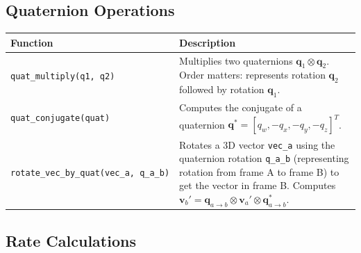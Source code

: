 \documentclass[
  letterpaper,
  DIV=11,
  numbers=noendperiod]{scrreprt}
\begin{document}
\subsection*{Quaternion Operations}\label{quaternion-operations}

\begin{longtable}[]{@{}
  >{\raggedright\arraybackslash}p{}
  >{\raggedright\arraybackslash}p{}@{}}
\toprule\noalign{}
\begin{minipage}[b]{\linewidth}\raggedright
Function
\end{minipage} & \begin{minipage}[b]{\linewidth}\raggedright
Description
\end{minipage} \\
\midrule\noalign{}
\endhead
\bottomrule\noalign{}
\endlastfoot
\texttt{quat\_multiply(q1,\ q2)} & Multiplies two quaternions
\(\mathbf{q}_1 \otimes \mathbf{q}_2\). Order matters: represents
rotation \(\mathbf{q}_2\) followed by rotation \(\mathbf{q}_1\). \\
\texttt{quat\_conjugate(quat)} & Computes the conjugate of a quaternion
\(\mathbf{q}^* = [q_w, -q_x, -q_y, -q_z]^T\). \\
\texttt{rotate\_vec\_by\_quat(vec\_a,\ q\_a\_b)} & Rotates a 3D vector
\texttt{vec\_a} using the quaternion rotation \texttt{q\_a\_b}
(representing rotation from frame A to frame B) to get the vector in
frame B. Computes
\(\mathbf{v}_b' = \mathbf{q}_{a \to b} \otimes \mathbf{v}_a' \otimes \mathbf{q}_{a \to b}^*\). \\
\end{longtable}

\subsection*{Rate Calculations}\label{rate-calculations}
\end{document}
